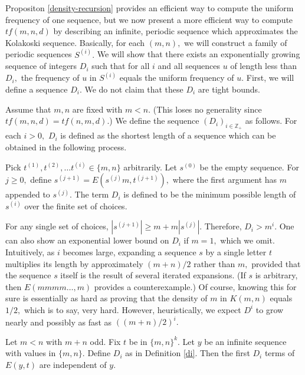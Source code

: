 \documentclass[11pt]{amsart} %
\begin{document}
Propositon \ref{density-recursion} provides an efficient way to compute the uniform frequency of one sequence, but we now present a more efficient way to compute $tf(m,n,d)$ by describing an infinite, periodic sequence which approximates the Kolakoski sequence. Basically, for each $(m,n),$ we will construct a family of periodic sequences $S^{(i)}.$ We will show that there exists an exponentially growing sequence of integers $D_i$ such that for all $i$ and all sequences $u$ of length less than $D_i,$ the frequency of $u$ in $S^{(i)}$ equals the uniform frequency of $u.$ First, we will define a sequence $D_i.$ We do not claim that these $D_i$ are tight bounds.

\begin{definition}\label{di}Assume that $m,n$ are fixed with $m<n.$ (This loses no generality since $tf(m,n,d) = tf(n,m,d).$) We define the sequence $(D_i)_{i \in \mathbb{Z}_+}$ as follows. For each $i >0,$ $D_i$ is defined as the shortest length of a sequence which can be obtained in the following process.

Pick $t^{(1)}, t^{(2)},  \ldots  t^{(i)} \in \{m,n\}$ arbitrarily. Let $s^{(0)}$ be the empty sequence. For $j \ge 0,$ define $s^{(j+1)} = E(s^{(j)} m, t^{(j+1)}),$ where the first argument has $m$ appended to $s^{(j)}.$ The term $D_i$ is defined to be the minimum possible length of $s^{(i)}$ over the finite set of choices.
\end{definition}

\begin{remark}
For any single set of choices, $|s^{(j+1)}| \ge m + m |s^{(j)}|.$ Therefore, $D_i > m^i.$ One can also show an exponential lower bound on $D_i$ if $m = 1,$ which we omit. Intuitively, as $i$ becomes large, expanding a sequence $s$ by a single letter $t$ multiplies its length by approximately $(m+n)/2$ rather than $m,$ provided that the sequence $s$ itself is the result of several iterated expansions. (If $s$ is arbitrary, then $E(mmmm \ldots, m)$ provides a counterexample.) Of course, knowing this for sure is essentially as hard as proving that the density of $m$ in $K(m,n)$ equals $1/2,$ which is to say, very hard. However, heuristically, we expect $D^i$ to grow nearly and possibly as fast as $((m+n)/2)^i.$
\end{remark}

\begin{lemma} \label{first-terms} Let $m<n$ with $m+n$ odd. Fix $t$ be in $\{m,n\}^k.$ Let $y$ be an infinite sequence with values in $\{m,n\}.$ Define $D_i$ as in Definition \ref{di}. Then the first $D_i$ terms of $E(y,t)$ are independent of $y.$
\end{lemma}
\end{document}
